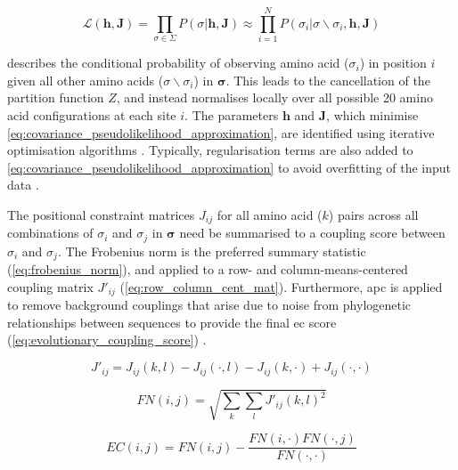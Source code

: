 \begin{equation}
    \mathcal{L}\left(\mathbf{h},\mathbf{J}\right)=\prod_{\sigma\in\Sigma}P\left(\sigma\rvert\mathbf{h},\mathbf{J}\right)\approx\prod_{i=1}^{N}P\left(\sigma_i\rvert\sigma\backslash\sigma_i,\mathbf{h},\mathbf{J}\right)
    \label{eq:covariance_pseudolikelihood_approximation}
\end{equation}

 describes the conditional probability of observing amino acid ($\sigma_i$) in position $i$ given all other amino acids ($\sigma\backslash\sigma_i$) in $\boldsymbol{\sigma}$. This leads to the cancellation of the partition function $Z$, and instead normalises locally over all possible 20 amino acid configurations at each site $i$. The parameters $\mathbf{h}$ and $\mathbf{J}$, which minimise \cref{eq:covariance_pseudolikelihood_approximation}, are identified using iterative optimisation algorithms \cite{Hopf2017-pp}. Typically, regularisation terms are also added to \cref{eq:covariance_pseudolikelihood_approximation} to avoid overfitting of the input data \cite{Hopf2017-pp}.

The positional constraint matrices $J_{ij}$ for all amino acid ($k$) pairs across all combinations of $\sigma_i$ and $\sigma_j$ in $\boldsymbol{\sigma}$ need be summarised to a coupling score between $\sigma_i$ and $\sigma_j$. The Frobenius norm is the preferred summary statistic (\cref{eq:frobenius_norm}), and applied to a row- and column-means-centered coupling matrix $J'_{ij}$ (\cref{eq:row_column_cent_mat}). Furthermore, \gls{apc} is applied to remove background couplings that arise due to noise from phylogenetic relationships between sequences to provide the final \gls{ec} score (\cref{eq:evolutionary_coupling_score}) \cite{Dunn2008-ao,Jones2012-ks,Ekeberg2013-ay,Kamisetty2013-le,Seemayer2014-zp}.

\begin{equation}
    J'_{ij}=J_{ij}(k,l)-J_{ij}(\cdot,l)-J_{ij}(k,\cdot)+J_{ij}(\cdot,\cdot)
    \label{eq:row_column_cent_mat}
\end{equation}

\begin{equation}
    FN(i,j)=\sqrt{\sum_{k}\sum_{l}J'_{ij}(k,l)^2}
    \label{eq:frobenius_norm}
\end{equation}

\begin{equation}
    EC(i,j)=FN(i,j)-\frac{FN(i,\cdot)FN(\cdot,j)}{FN(\cdot,\cdot)}
    \label{eq:evolutionary_coupling_score}
\end{equation}

